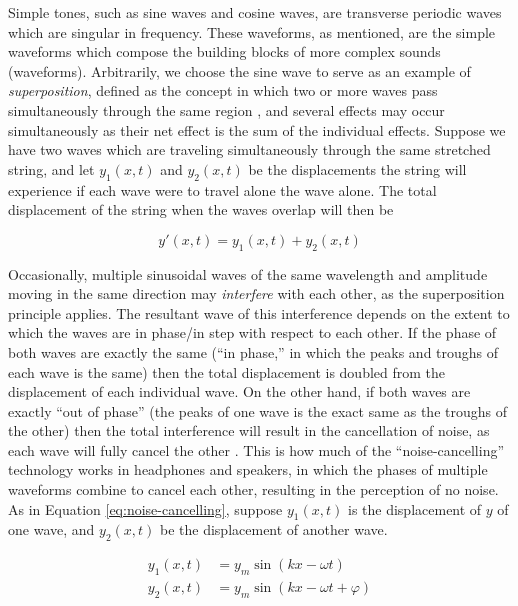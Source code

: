 Simple tones, such as sine waves and cosine waves, are transverse periodic waves which are singular in frequency. These waveforms, as mentioned, are the simple waveforms which compose the building blocks of more complex sounds (waveforms). Arbitrarily, we choose the sine wave to serve as an example of \textit{superposition}, defined as the concept in which two or more waves pass simultaneously through the same region \cite{Halliday_Resnick_Walker_2005}, and several effects may occur simultaneously as their net effect is the sum of the individual effects. Suppose we have two waves which are traveling simultaneously through the same stretched string, and let $y_1(x, t)$ and $y_2(x, t)$ be the displacements the string will experience if each wave were to travel alone the wave alone. The total displacement of the string when the waves overlap will then be

\begin{equation}
	y'(x, t) = y_1(x, t) + y_2(x, t)
\end{equation}

Occasionally, multiple sinusoidal waves of the same wavelength and amplitude moving in the same direction may \textit{interfere} with each other, as the superposition principle applies. The resultant wave of this interference depends on the extent to which the waves are in phase/in step with respect to each other. If the phase of both waves are exactly the same (``in phase,'' in which the peaks and troughs of each wave is the same) then the total displacement is doubled from the displacement of each individual wave. On the other hand, if both waves are exactly ``out of phase'' (the peaks of one wave is the exact same as the troughs of the other) then the total interference will result in the cancellation of noise, as each wave will fully cancel the other \cite{Halliday_Resnick_Walker_2005}. This is how much of the ``noise-cancelling'' technology works in headphones and speakers, in which the phases of multiple waveforms combine to cancel each other, resulting in the perception of no noise. As in Equation \ref{eq:noise-cancelling}, suppose $y_1(x, t)$ is the displacement of $y$ of one wave, and $y_2(x, t)$ be the displacement of another wave. 

\begin{equation}
	\begin{aligned}
	y_1(x, t) &= y_m\sin(kx - \omega t) \\ 
	y_2(x, t) &= y_m\sin(kx - \omega t + \varphi)
	\label{eq:noise-cancelling}
	\end{aligned}
\end{equation}

